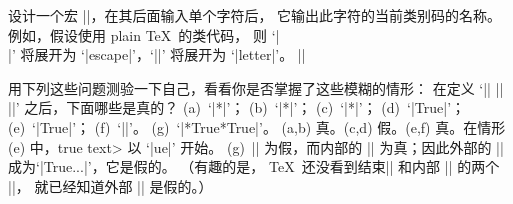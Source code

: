 {{{{{{{{%
\ddangerexercise 设计一个宏 |\category|，在其后面输入单个字符后，
它输出此字符的当前类别码的名称。例如，假设使用 plain \TeX\ 的类代码，
则 `|\category\\|' 将展开为 `|escape|'，`|\category\a|' 将展开为 `|letter|'。
\answer |\def\category#1{\ifcase\catcode`#1|\parbreak
        |  escape\or begingroup\or endgroup\or math\or|\parbreak
        |  align\or endline\or parameter\or superscript\or|\parbreak
        |  subscript\or ignored\or space\or letter\or|\parbreak
        |  otherchar\or active\or comment\or invalid\fi}|\par

\ddangerexercise 用下列这些问题测验一下自己，看看你是否掌握了这些模糊的情形：
在定义 `|\def\a{}| |\def\b{**}| |\def\c{True}|' 之后，下面哪些是真的？
(a)~`|\if\a\b|'；
(b)~`|\ifcat\a\b|'；
(c)~`|\ifx\a\b|'；
(d)~`|\if\c|'；
(e)~`|\ifcat\c|'；
(f)~`|\ifx\ifx\ifx|'。
(g)~`|\if\ifx\a\b\c\else\if\a\b\c\fi\fi|'。
\answer (a,b) 真。(c,d) 假。(e,f) 真。在情形 (e) 中，\<true text> 以 `|ue|' 开始。
(g)~|\ifx| 为假，而内部的 |\if| 为真；因此外部的 |\if| 成为`|\if True...|'，它是假的。%
（有趣的是， \TeX\ 还没看到结束|\ifx| 和内部 |\if| 的两个 |\fi|，
就已经知道外部 |\if| 是假的。）

}}}}}}}}
